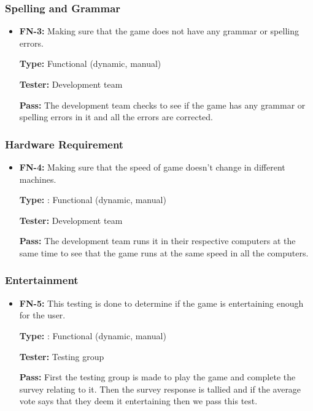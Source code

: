\documentclass[12pt,letterpaper]{article}
\begin{document}
	\subsubsection{Spelling and Grammar}
\begin{reqbox}
	\begin{itemize}
	\item \textbf{FN-3: }Making sure that the game does not have any grammar or spelling errors.

	\textbf{Type: }Functional (dynamic, manual)

	\textbf{Tester:  }Development team

	\textbf{Pass: }The development team checks to see if the game has any grammar or spelling errors in it and all the errors are corrected.
	\end{itemize}
\end{reqbox}

	\subsubsection{Hardware Requirement}
\begin{reqbox}
	\begin{itemize}	
	\item \textbf{FN-4: }Making sure that the speed of game doesn’t change in different machines. 

	\textbf{Type: }: Functional (dynamic, manual)
	
	\textbf{Tester:  }Development team
	
	\textbf{Pass: }The development team runs it in their respective computers at the same time to see that the game runs at the same speed in all the computers.
	\end{itemize}
\end{reqbox}

	\subsubsection{Entertainment}
\begin{reqbox}
	\begin{itemize}
	\item \textbf{FN-5: }This testing is done to determine if the game is entertaining enough for the user. 

	\textbf{Type: }: Functional (dynamic, manual)

	\textbf{Tester:  }Testing group

	\textbf{Pass: }First the testing group is made to play the game and complete the survey relating to it. Then the survey response is tallied and if the average vote says that they deem it entertaining then we pass this test.

	\end{itemize}
\end{reqbox}
\end{document}
